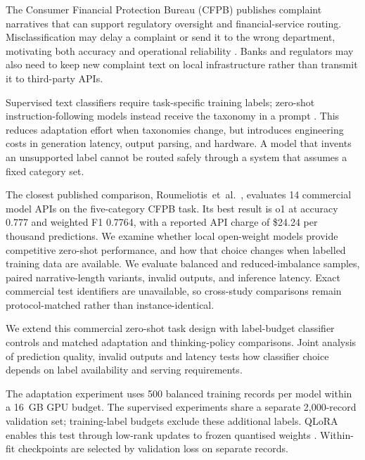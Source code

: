\documentclass[pdflatex,sn-mathphys-num]{sn-jnl}
\begin{document}
The Consumer Financial Protection Bureau (CFPB) publishes complaint
narratives that can support regulatory oversight and financial-service
routing. Misclassification may delay a complaint or send it to the
wrong department, motivating both accuracy and operational reliability
\cite{das2024explainable,liu2024framework,jondhale2024cfpb,di2023complaint}.
Banks and regulators may also need to keep new complaint text on local
infrastructure rather than transmit it to third-party APIs.

Supervised text classifiers require task-specific training labels;
zero-shot instruction-following models instead receive the taxonomy
in a prompt \cite{devlin2019bert,brown2020gpt3,kojima2022zeroshotcot}.
This reduces adaptation effort when taxonomies change, but introduces
engineering costs in generation latency, output parsing, and hardware.
A model that invents an unsupported label cannot be routed safely through
a system that assumes a fixed category set.

The closest published comparison, Roumeliotis~et~al.\
\cite{roumeliotis2025think}, evaluates 14 commercial model APIs on the
five-category CFPB task. Its best result is o1 at accuracy 0.777 and
weighted F1 0.7764, with a reported API charge of
\$24.24 per thousand predictions. We examine whether local open-weight
models provide competitive zero-shot performance, and how that choice
changes when labelled training data are available. We evaluate balanced
and reduced-imbalance samples, paired narrative-length variants,
invalid outputs, and inference latency. Exact commercial test identifiers
are unavailable, so cross-study comparisons remain protocol-matched
rather than instance-identical.

We extend this commercial zero-shot task design with label-budget
classifier controls and matched adaptation and thinking-policy comparisons.
Joint analysis of prediction quality, invalid outputs and latency tests
how classifier choice depends on label availability and serving requirements.

The adaptation experiment uses 500 balanced training records per model
within a 16~GB GPU budget. The supervised experiments share a separate
2,000-record validation set; training-label budgets exclude these
additional labels.
QLoRA enables this test through low-rank updates to frozen
quantised weights \cite{hu2021lora,dettmers2023qlora}. Within-fit
checkpoints are selected by validation loss on separate records.
\end{document}
